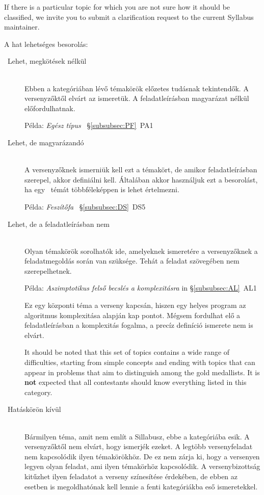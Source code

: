 \documentclass[a4paper,11pt,oneside]{article}
\newcommand{\cmark}{\ding{51}}%
\newcommand{\cincl}{{\small\cmark}}
\newcommand{\cdefi}{{\small\cmark\faFileTextO}}
\newcommand{\ccode}{{\small\cmark\faFileText}}
\newcommand{\cnfoc}{{\small\faQuestion}}
\begin{document}
If there is a particular topic for which you are not sure how it should
be classified, we invite you to submit a clarification request to the 
current Syllabus maintainer.

\bigskip

\noindent
A hat lehetséges besorolás:

\begin{description}
\item[\cincl\ Lehet, megkötések nélkül]~\\
    Ebben a kategóriában lévő témakörök előzetes tudásnak tekintendők. A versenyzőktől elvárt az ismeretük.
    A feladatleírásban magyarázat nélkül előfordulhatnak.

    Példa: \emph{Egész típus} ~\S\ref{subsubsec:PF}~PA1

\item[\cdefi\ Lehet, de magyarázandó]~\\
    A versenyzőknek ismerniük kell ezt a témakört, de amikor feladatleírásban szerepel, akkor definiálni kell.
    Általában akkor használjuk ezt a besorolást, ha egy \cincl\  témát többféleképpen is lehet értelmezni.

    Példa: \emph{Feszítőfa} ~\S\ref{subsubsec:DS}~DS5

\item[\ccode\ Lehet, de a feladatleírásban nem]~\\
    Olyan témakörök sorolhatók ide, amelyeknek ismeretére a versenyzőknek a feladatmegoldás során van szüksége.
    Tehát a feladat szövegében nem szerepelhetnek.
    
    Példa: \emph{Aszimptotikus felső becslés a komplexitásra}
    in \S\ref{subsubsec:AL}~AL1

    Ez egy központi téma a verseny kapcsán, hiszen egy helyes program az algoritmus komplexitása alapján kap pontot.
    Mégsem fordulhat elő a feladatleírásban a komplexitás fogalma, a precíz definíció ismerete nem is elvárt.

    It should be noted that this set of topics
    contains a wide range of difficulties, starting from simple concepts and ending 
    with topics that can appear in problems that aim to distinguish among 
    the gold medallists. It is \textbf{not} expected that all contestants
    should know everything listed in this category.

\item[\cnfoc\ Hatáskörön kívül]~\\
    Bármilyen téma, amit nem említ a Sillabusz, ebbe a kategóriába esik.
    A versenyzőktől nem elvárt, hogy ismerjék ezeket. A legtöbb versenyfeladat
    nem kapcsolódik ilyen témakörökhöz. De ez nem zárja ki, hogy a versenyen
    legyen olyan feladat, ami ilyen témakörhöz kapcsolódik. A versenybizottság
    kitűzhet ilyen feladatot a verseny színesítése érdekében, de ebben az esetben
    is megoldhatónak kell lennie a fenti kategóriákba eső ismeretekkel.   



\end{description}
\end{document}
